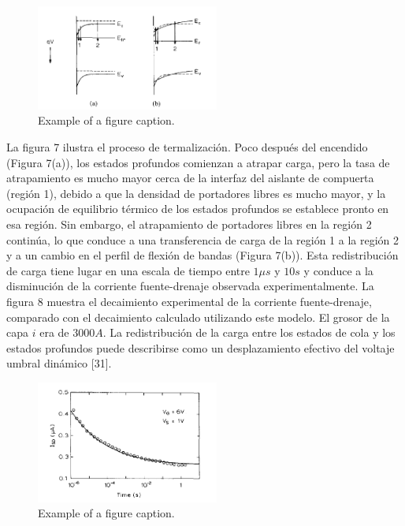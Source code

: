 \documentclass[conference]{IEEEtran}
\begin{document}
\begin{figure}[htbp]
    \centerline{\includegraphics[width=6.0cm]{img/imagen-7.png}}
    \caption{Example of a figure caption.}%
    \label{fig7}
\end{figure} 
    
    La figura 7 ilustra el proceso de termalización. Poco después del encendido (Figura 7(a)), 
    los estados profundos comienzan a atrapar carga, pero la tasa de atrapamiento es mucho mayor 
    cerca de la interfaz del aislante de compuerta (región 1), debido a que la densidad  de 
    portadores libres es mucho mayor, y la ocupación de equilibrio térmico de los estados profundos 
    se establece pronto en esa región. Sin embargo, el atrapamiento de portadores libres en la 
    región 2 continúa, lo que conduce a una transferencia de carga de la región 1 a la región 2 y 
    a un cambio en el perfil de flexión de bandas (Figura 7(b)). Esta redistribución de carga tiene 
    lugar en una escala de tiempo entre $1\mu s$ y $10s$ y conduce a la disminución de la corriente 
    fuente-drenaje observada experimentalmente. La figura 8 muestra el decaimiento experimental de 
    la corriente fuente-drenaje, comparado con el decaimiento calculado utilizando este modelo. 
    El grosor de la capa $i$ era de $3000 A$. La redistribución de la carga entre los estados de 
    cola y los estados profundos puede describirse como un desplazamiento efectivo del voltaje umbral 
    dinámico [31].

\begin{figure}[htbp]
    \centerline{\includegraphics[width=6.0cm]{img/imagen-8.png}}
    \caption{Example of a figure caption.}%
    \label{fig8}
\end{figure} 
    
\end{document}
